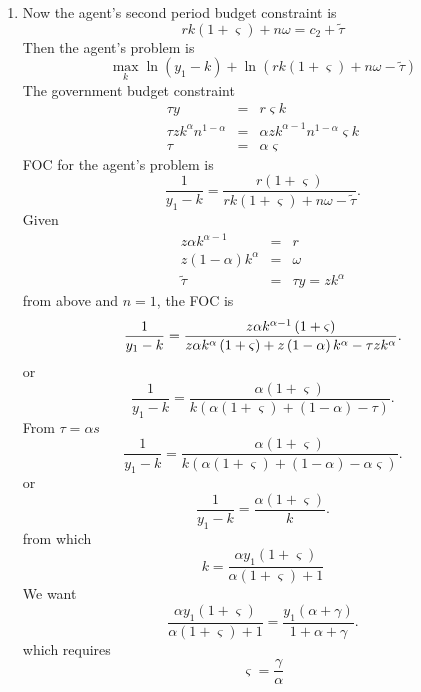 \documentclass{article}
\begin{document}
\begin{enumerate}
\begin{enumerate}
\item Now the agent's second period budget constraint is 
\begin{equation*}
rk\left( 1+\varsigma \right) +n\omega =c_{2}+\tilde{\tau}
\end{equation*}%
Then the agent's problem is 
\begin{equation*}
\underset{k}{\max }\ln \left( y_{1}-k\right) +\ln \left( rk\left(
1+\varsigma \right) +n\omega -\tilde{\tau}\right) 
\end{equation*}%
The government budget constraint 
\begin{eqnarray*}
\tau y &=&r\varsigma k \\
\tau zk^{\alpha }n^{1-\alpha } &=&\alpha zk^{\alpha -1}n^{1-\alpha
}\varsigma k \\
\tau  &=&\alpha \varsigma 
\end{eqnarray*}%
FOC for the agent's problem is 
\begin{equation*}
\frac{1}{y_{1}-k}=\frac{r\left( 1+\varsigma \right) }{rk\left( 1+\varsigma
\right) +n\omega -\tilde{\tau}}.
\end{equation*}%
Given 
\begin{eqnarray*}
z\alpha k^{\alpha -1} &=&r \\
z\left( 1-\alpha \right) k^{\alpha } &=&\omega  \\
\tilde{\tau} &=&\tau y=zk^{\alpha }
\end{eqnarray*}%
from above and $n=1$, the FOC is%
\begin{equation*}
\frac{1}{y_{1}-k}=\frac{z\alpha k^{\alpha -1}\left( 1+\varsigma \right) }{%
z\alpha k^{\alpha }\left( 1+\varsigma \right) +z\left( 1-\alpha \right)
k^{\alpha }-\tau zk^{\alpha }}.
\end{equation*}%
or 
\begin{equation*}
\frac{1}{y_{1}-k}=\frac{\alpha \left( 1+\varsigma \right) }{k\left( \alpha
\left( 1+\varsigma \right) +\left( 1-\alpha \right) -\tau \right) }.
\end{equation*}%
From $\tau =\alpha s$ 
\begin{equation*}
\frac{1}{y_{1}-k}=\frac{\alpha \left( 1+\varsigma \right) }{k\left( \alpha
\left( 1+\varsigma \right) +\left( 1-\alpha \right) -\alpha \varsigma
\right) }.
\end{equation*}%
or%
\begin{equation*}
\frac{1}{y_{1}-k}=\frac{\alpha \left( 1+\varsigma \right) }{k}.
\end{equation*}%
from which%
\begin{equation*}
k=\frac{\alpha y_{1}\left( 1+\varsigma \right) }{\alpha \left( 1+\varsigma
\right) +1}
\end{equation*}%
We want 
\begin{equation*}
\frac{\alpha y_{1}\left( 1+\varsigma \right) }{\alpha \left( 1+\varsigma
\right) +1}=\frac{y_{1}\left( \alpha +\gamma \right) }{1+\alpha +\gamma }.
\end{equation*}%
which requires 
\begin{equation*}
\varsigma =\frac{\gamma }{\alpha }
\end{equation*}


\end{enumerate}
\end{enumerate}
\end{document}
